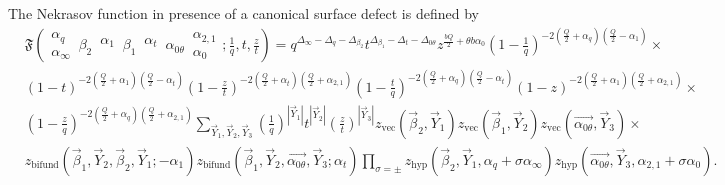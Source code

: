 \documentclass[11pt]{article}
\numberwithin{equation}{section}
\begin{document}
The Nekrasov function in presence of a canonical surface defect is defined by
\begin{equation}
\begin{aligned}\label{blockaround0}
    &\mathfrak{F}\left(\begin{matrix}\alpha_q\\ \alpha_{\infty}\end{matrix}\,\beta_2\,\begin{matrix}\alpha_1\\ {}\end{matrix}\,\beta_1\,\begin{matrix}\alpha_t\\ {}\end{matrix}\,\alpha_{0\theta}\,\begin{matrix}\alpha_{2,1}\\ \alpha_{0}\end{matrix};\frac{1}{q},t,\frac{z}{t}\right)=q^{\Delta_{\infty}-\Delta_q-\Delta_{\beta_2}} t^{\Delta_{\beta_1} - \Delta_t - \Delta_{0\theta}} z^{\frac{bQ}{2}+\theta b \alpha_0}\left(1-\frac{1}{q}\right)^{-2\left(\frac{Q}{2}+\alpha_q\right)\left(\frac{Q}{2}-\alpha_1\right)}\times\\
    & (1-t)^{-2\left(\frac{Q}{2}+ \alpha_1\right)\left(\frac{Q}{2}-\alpha_t\right)}\left(1-\frac{z}{t}\right)^{-2(\frac{Q}{2}+ \alpha_t)\left(\frac{Q}{2}+\alpha_{2,1}\right)}
    \left(1-\frac{t}{q}\right)^{-2\left(\frac{Q}{2}+\alpha_q\right)\left(\frac{Q}{2}-\alpha_t\right)}(1-z)^{-2\left(\frac{Q}{2}+ \alpha_1\right)\left(\frac{Q}{2}+\alpha_{2,1}\right)}\times\\
    &\left(1-\frac{z}{q}\right)^{-2\left(\frac{Q}{2}+\alpha_q\right)\left(\frac{Q}{2}+\alpha_{2,1}\right)}\sum_{\vec{Y}_1,\vec{Y}_2,\vec{Y}_3} \left(\frac{1}{q}\right)^{| \vec{Y}_1 |}t^{| \vec{Y}_2 |} \left(\frac{z}{t}\right)^{|\vec{Y}_3|} z_{\text{vec}} \left( \vec{\beta}_2, \vec{Y}_1 \right)z_{\text{vec}} \left( \vec{\beta}_1, \vec{Y}_2 \right)z_{\text{vec}} \left( \vec{\alpha_{0\theta}}, \vec{Y}_3 \right)\times\\
    &  z_{\text{bifund}} \left(\vec{\beta}_1,\vec{Y}_2,\vec{\beta}_2,\vec{Y}_1;-\alpha_1 \right)z_{\text{bifund}} \left( \vec{\beta}_1,\vec{Y}_2,\vec{\alpha_{0\theta}},\vec{Y}_3;\alpha_t \right)\prod_{\sigma = \pm}  z_{\text{hyp}} \left( \vec{\beta}_2, \vec{Y}_1, \alpha_q + \sigma \alpha_\infty \right) z_{\text{hyp}} \left( \vec{\alpha_{0\theta}}, \vec{Y}_3, \alpha_{2,1} + \sigma \alpha_0 \right).
\end{aligned}
\end{equation}
\end{document}
